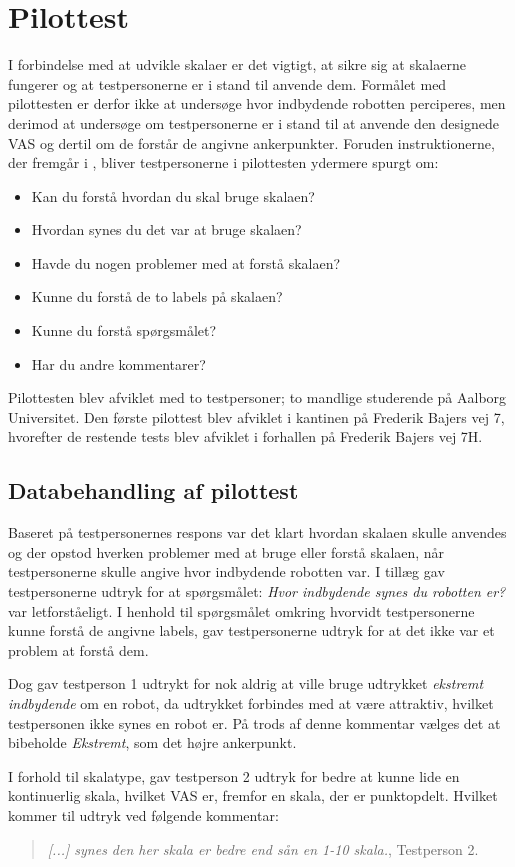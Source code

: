 \section{Pilottest}
\label{SkaleringseksperimentPilottest}
%
I forbindelse med at udvikle skalaer er det vigtigt, at sikre sig at skalaerne fungerer og at testpersonerne er i stand til anvende dem. Formålet med pilottesten er derfor ikke at undersøge hvor indbydende robotten perciperes, men derimod at undersøge om testpersonerne er i stand til at anvende den designede VAS og dertil om de forstår de angivne ankerpunkter. \blankline
%
Foruden instruktionerne, der fremgår i , bliver testpersonerne i pilottesten ydermere spurgt om:\blankline   
%
\begin{itemize}
	\item Kan du forstå hvordan du skal bruge skalaen?
	\item Hvordan synes du det var at bruge skalaen?
	\item Havde du nogen problemer med at forstå skalaen?
	\item Kunne du forstå de to labels på skalaen?
	\item Kunne du forstå spørgsmålet?
	\item Har du andre kommentarer?\blankline
\end{itemize} 
%
Pilottesten blev afviklet med to testpersoner; to mandlige studerende på Aalborg Universitet. Den første pilottest blev afviklet i kantinen på Frederik Bajers vej 7, hvorefter de restende tests blev afviklet i forhallen på Frederik Bajers vej 7H. 
%
\subsection{Databehandling af pilottest}
\label{SkaleringseksperimentDatabehandlingPilottest}
%
Baseret på testpersonernes respons var det klart hvordan skalaen skulle anvendes og der opstod hverken problemer med at bruge eller forstå skalaen, når testpersonerne skulle angive hvor indbydende robotten var. I tillæg gav testpersonerne udtryk for at spørgsmålet: \textit{Hvor indbydende synes du robotten er?} var letforståeligt. I henhold til spørgsmålet omkring hvorvidt testpersonerne kunne forstå de angivne labels, gav testpersonerne udtryk for at det ikke var et problem at forstå dem. 

Dog gav testperson 1 udtrykt for nok aldrig at ville bruge udtrykket \textit{ekstremt indbydende} om en robot, da udtrykket forbindes med at være attraktiv, hvilket testpersonen ikke synes en robot er. På trods af denne kommentar vælges det at bibeholde \textit{Ekstremt}, som det højre ankerpunkt.

I forhold til skalatype, gav testperson 2 udtryk for bedre at kunne lide en kontinuerlig skala, hvilket VAS er, fremfor en skala, der er punktopdelt. Hvilket kommer til udtryk ved følgende kommentar:
% 
\begin{quotation}
  \textit{[...] synes den her skala er bedre end sån en 1-10 skala.}, Testperson 2.
\end{quotation}



 